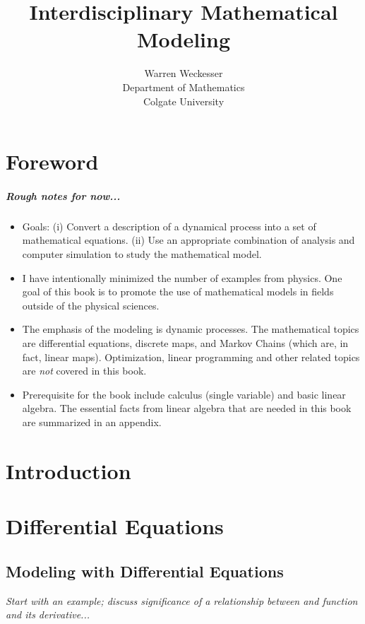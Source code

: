 \documentclass{book}
\title{\textbf{Interdisciplinary Mathematical Modeling}}
\author{Warren Weckesser\\
Department of Mathematics\\
Colgate University}
\begin{document}
\maketitle
\tableofcontents
%
%
%

\chapter*{Foreword}
\paragraph{Rough notes for now...}
\begin{itemize}
\item Goals: (i) Convert a description of a dynamical process
into a set of mathematical equations.
(ii) Use an appropriate combination of analysis and computer
simulation to study the mathematical model.
\item  I have intentionally minimized the
number of examples from physics.
One goal of this book is
to promote the use of mathematical models in fields outside of the
physical sciences.
\item The emphasis of the modeling is dynamic processes.
The mathematical topics are differential equations, discrete maps,
and Markov Chains (which are, in fact, linear maps).
Optimization, linear programming and other related topics
are \emph{not} covered in this book.
\item Prerequisite for the book include calculus (single variable)
and basic linear algebra.  The essential facts from linear algebra that
are needed in this book are summarized in an appendix.
\end{itemize}
%
%
%

\chapter{Introduction}
%
%
%

\chapter{Differential Equations}

\section{Modeling with Differential Equations}
\emph{Start with an example; discuss significance of a
relationship between and function and its derivative...}
%
\end{document}
